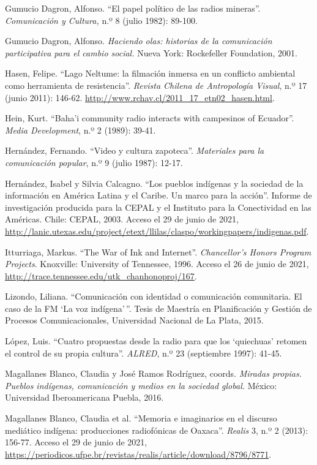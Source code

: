 \documentclass{tufte-handout}
\begin{document}
\begin{hangparas}{.25in}{1}
Gumucio Dagron, Alfonso. ``El papel político de las radios mineras''.
\emph{Comunicación y Cultura,} n.º 8 (julio 1982): 89-100.

Gumucio Dagron, Alfonso. \emph{Haciendo olas: historias de la
comunicación participativa para el cambio social.} Nueva York:
Rockefeller Foundation, 2001.

Hasen, Felipe. ``Lago Neltume: la filmación inmersa en un conflicto
ambiental como herramienta de resistencia''. \emph{Revista Chilena de
Antropología Visual}, n.º 17 (junio 2011): 146-62.
\url{http://www.rchav.cl/2011_17_etn02_hasen.html}.

Hein, Kurt. ``Baha'i community radio interacts with campesinos of
Ecuador''. \emph{Media Development}, n.º 2 (1989): 39-41.

Hernández, Fernando. ``Video y cultura zapoteca''. \emph{Materiales para
la comunicación popular}, n.º 9 (julio 1987): 12-17.

Hernández, Isabel y Silvia Calcagno. ``Los pueblos indígenas y la
sociedad de la información en América Latina y el Caribe. Un marco para
la acción''. Informe de investigación producida para la CEPAL y el
Instituto para la Conectividad en las Américas. Chile: CEPAL, 2003.
Acceso el 29 de junio de 2021,
\url{http://lanic.utexas.edu/project/etext/llilas/claspo/workingpapers/indigenas.pdf}.

Itturriaga, Markus. ``The War of Ink and Internet''. \emph{Chancellor's
Honors Program Projects}. Knoxville: University of Tennessee, 1996.
Acceso el 26 de junio de 2021, \url{http://trace.tennessee.edu/utk\_chanhonoproj/167}.


Lizondo, Liliana. ``Comunicación con identidad o comunicación
comunitaria. El caso de la FM `La voz indígena'\,''. Tesis de Maestría
en Planificación y Gestión de Procesos Comunicacionales, Universidad
Nacional de La Plata, 2015.

López, Luis. ``Cuatro propuestas desde la radio para que los `quiechuas'
retomen el control de su propia cultura''. \emph{ALRED}, n.º 23
(septiembre 1997): 41-45.

Magallanes Blanco, Claudia y José Ramos Rodríguez, coords. \emph{Miradas
propias. Pueblos indígenas, comunicación y medios en la sociedad
global.} México: Universidad Iberoamericana Puebla, 2016.

Magallanes Blanco, Claudia et al. ``Memoria e imaginarios en el discurso
mediático indígena: producciones radiofónicas de Oaxaca''. \emph{Realis}
3, n.º 2 (2013): 156-77. Acceso el 29 de junio de 2021,
\url{https://periodicos.ufpe.br/revistas/realis/article/download/8796/8771}.


\end{hangparas}
\end{document}
